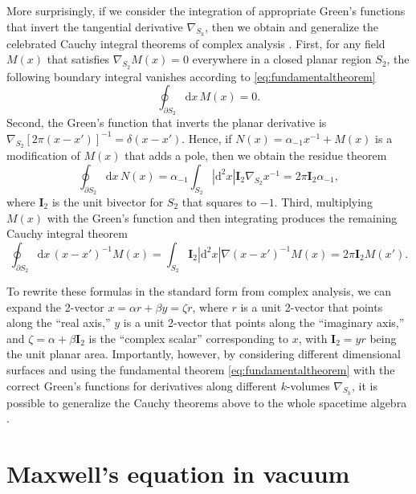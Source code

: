 \documentclass[1p,sort&compress]{elsarticle}
\numberwithin{equation}{section}
\newcommand{\bv}[1]{\mathbf{#1}}
\begin{document}
More surprisingly, if we consider the integration of appropriate Green's functions that invert the tangential derivative $\nabla_{S_k}$, then we obtain and generalize the celebrated Cauchy integral theorems of complex analysis \cite{Hestenes1968b,Doran2007}.  
First, for any field $M(x)$ that satisfies $\nabla_{S_2} M(x) = 0$ everywhere in a closed planar region $S_2$, the following boundary integral vanishes according to \eqref{eq:fundamentaltheorem}
\begin{equation}
  \oint_{\partial S_2}\!\! \textrm{d}x\, M(x) = 0.
\end{equation}
Second, the Green's function that inverts the planar derivative is $\nabla_{S_2}[2\pi(x-x')]^{-1} = \delta(x-x')$.  Hence, if $N(x) = \alpha_{-1}x^{-1} + M(x)$ is a modification of $M(x)$ that adds a pole, then we obtain the residue theorem
\begin{equation}
  \oint_{\partial S_2}\!\! \textrm{d}x\, N(x) = \alpha_{-1} \int_{S_2}\!\! |\textrm{d}^2x|\bv{I}_2 \nabla_{S_2}x^{-1} = 2\pi \bv{I}_2 \alpha_{-1},
\end{equation}
where $\bv{I}_2$ is the unit bivector for $S_2$ that squares to $-1$.  Third, multiplying $M(x)$ with the Green's function and then integrating produces the remaining Cauchy integral theorem
\begin{equation}
  \oint_{\partial S_2} \!\! \textrm{d}x\, (x-x')^{-1}M(x) = \int_{S_2}\!\! \bv{I}_2|\textrm{d}^2\!x|\nabla(x-x')^{-1}M(x) = 2\pi \bv{I}_2 M(x').
\end{equation}

To rewrite these formulas in the standard form from complex analysis, we can expand the 2-vector $x = \alpha r + \beta y = \zeta r$, where $r$ is a unit 2-vector that points along the ``real axis,'' $y$ is a unit 2-vector that points along the ``imaginary axis,'' and $\zeta = \alpha + \beta \bv{I}_2$ is the ``complex scalar'' corresponding to $x$, with $\bv{I}_2 = yr$ being the unit planar area.  Importantly, however, by considering different dimensional surfaces and using the fundamental theorem \eqref{eq:fundamentaltheorem} with the correct Green's functions for derivatives along different $k$-volumes $\nabla_{S_k}$, it is possible to generalize the Cauchy theorems above to the whole spacetime algebra \cite{Hestenes1968b,Doran2007}.


\section{Maxwell's equation in vacuum}\label{sec:maxwell}
\end{document}

